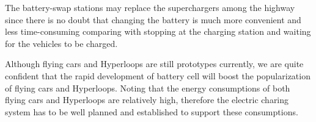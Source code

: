 The battery-swap stations may replace the superchargers among the highway since there is no doubt that changing the battery is much more convenient and less time-consuming comparing with stopping at the charging station and waiting for the vehicles to be charged.

Although flying cars and Hyperloops are still prototypes currently, we are quite confident that the rapid development of battery cell will boost the popularization of flying cars and Hyperloops. Noting that the energy consumptions of both flying cars and Hyperloops are relatively high, therefore the electric charing system has to be well planned and established to support these consumptions.

